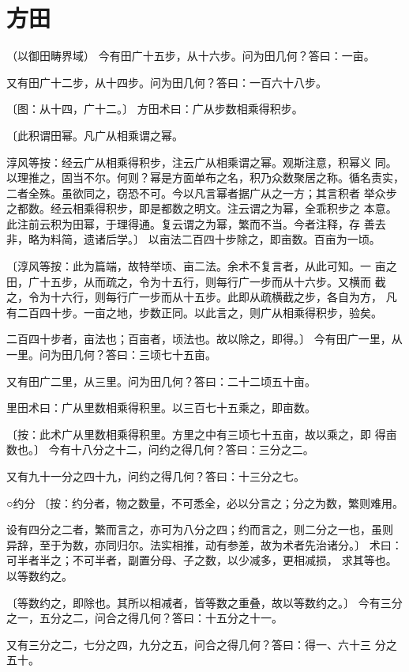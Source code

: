 \documentclass[a4paper,12pt,UTF8,twoside]{ctexbook}
\begin{document}
\mainmatter
\chapter{方田}

（以御田畴界域） 今有田广十五步，从十六步。问为田几何？答曰：一亩。

又有田广十二步，从十四步。问为田几何？答曰：一百六十八步。

〔图：从十四，广十二。〕 方田术曰：广从步数相乘得积步。

〔此积谓田幂。凡广从相乘谓之幂。

淳风等按：经云广从相乘得积步，注云广从相乘谓之幂。观斯注意，积幂义 同。以理推之，固当不尔。何则？幂是方面单布之名，积乃众数聚居之称。循名责实，二者全殊。虽欲同之，窃恐不可。今以凡言幂者据广从之一方；其言积者 举众步之都数。经云相乘得积步，即是都数之明文。注云谓之为幂，全乖积步之 本意。此注前云积为田幂，于理得通。复云谓之为幂，繁而不当。今者注释，存 善去非，略为料简，遗诸后学。〕 以亩法二百四十步除之，即亩数。百亩为一顷。

〔淳风等按：此为篇端，故特举顷、亩二法。余术不复言者，从此可知。一 亩之田，广十五步，从而疏之，令为十五行，则每行广一步而从十六步。又横而 截之，令为十六行，则每行广一步而从十五步。此即从疏横截之步，各自为方， 凡有二百四十步。一亩之地，步数正同。以此言之，则广从相乘得积步，验矣。

二百四十步者，亩法也；百亩者，顷法也。故以除之，即得。〕 今有田广一里，从一里。问为田几何？答曰：三顷七十五亩。

又有田广二里，从三里。问为田几何？答曰：二十二顷五十亩。

里田术曰：广从里数相乘得积里。以三百七十五乘之，即亩数。

〔按：此术广从里数相乘得积里。方里之中有三顷七十五亩，故以乘之，即 得亩数也。〕 今有十八分之十二，问约之得几何？答曰：三分之二。

又有九十一分之四十九，问约之得几何？答曰：十三分之七。

○约分 〔按：约分者，物之数量，不可悉全，必以分言之；分之为数，繁则难用。

设有四分之二者，繁而言之，亦可为八分之四；约而言之，则二分之一也，虽则 异辞，至于为数，亦同归尔。法实相推，动有参差，故为术者先治诸分。〕 术曰：可半者半之；不可半者，副置分母、子之数，以少减多，更相减损， 求其等也。以等数约之。

〔等数约之，即除也。其所以相减者，皆等数之重叠，故以等数约之。〕 今有三分之一，五分之二，问合之得几何？答曰：十五分之十一。

又有三分之二，七分之四，九分之五，问合之得几何？答曰：得一、六十三 分之五十。
\end{document}
